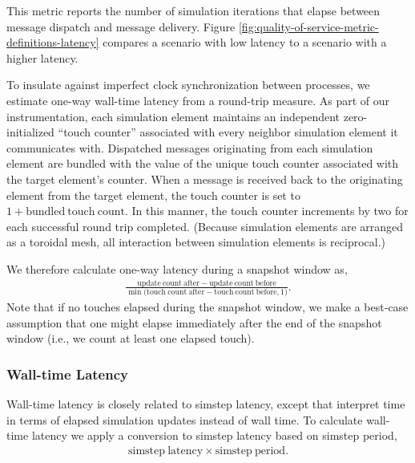 This metric reports the number of simulation iterations that elapse between message dispatch and message delivery.
Figure \ref{fig:quality-of-service-metric-definitions-latency} compares a scenario with low latency to a scenario with a higher latency.

To insulate against imperfect clock synchronization between processes, we estimate one-way wall-time latency from a round-trip measure.
As part of our instrumentation, each simulation element maintains an independent zero-initialized ``touch counter'' associated with every neighbor simulation element it communicates with.
Dispatched messages originating from each simulation element are bundled with the value of the unique touch counter associated with the target element's counter.
When a message is received back to the originating element from the target element, the touch counter is set to $1 + \mathrm{bundled\ touch\ count}$.
In this manner, the touch counter increments by two for each successful round trip completed.
(Because simulation elements are arranged as a toroidal mesh, all interaction between simulation elements is reciprocal.)

We therefore calculate one-way latency during a snapshot window as,
\begin{align*}
  \frac{
    \mathrm{update\ count\ after} - \mathrm{update\ count\ before}
  }{
    \min\Big( \mathrm{ touch\ count\ after } - \mathrm{ touch\ count\ before }, 1 \Big)
  }.
\end{align*}
Note that if no touches elapsed during the snapshot window, we make a best-case assumption that one might elapse immediately after the end of the snapshot window (i.e., we count at least one elapsed touch).


\subsubsection{Wall-time Latency} \label{sec:simulation-time-latency-metric}

Wall-time latency is closely related to simstep latency, except that interpret time in terms of elapsed simulation updates instead of wall time.
To calculate wall-time latency we apply a conversion to simstep latency based on simstep period,
\begin{align*}
  \mathrm{simstep\ latency} \times \mathrm{simstep\ period}.
\end{align*}

